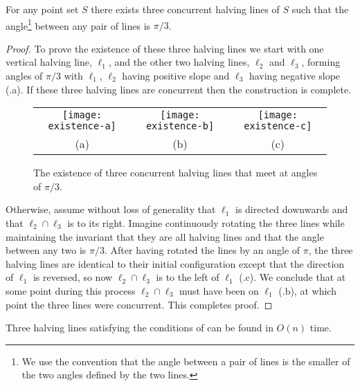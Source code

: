 \documentclass[lotsofwhite]{patmorin}
\begin{document}
\begin{lem}
For any point set $S$ there exists three concurrent halving lines 
of $S$ such that the angle\footnote{We use the convention that
the angle between a pair of lines is the smaller of the two angles
defined by the two lines.} between any pair of lines is $\pi/3$.
\end{lem}

\begin{proof}
To prove the existence of these three halving lines we start with one
vertical halving line, $\ell_1$, and the other two halving lines,
$\ell_2$ and $\ell_3$, forming angles of $\pi/3$ with $\ell_1$,
$\ell_2$ having positive slope and $\ell_3$ having negative slope
(.a).  If these three halving lines are concurrent
then the construction is complete. 

\begin{figure}
\begin{center}\begin{tabular}{ccc}
\texttt{[image: existence-a]} &
\texttt{[image: existence-b]} &
\texttt{[image: existence-c]} \\
(a) & (b) & (c)
\end{tabular}\end{center}
\caption{The existence of three concurrent halving lines that meet at angles of
$\pi/3$.}
\end{figure}
Otherwise, assume without loss of generality that $\ell_1$ is directed downwards and that
$\ell_2\cap \ell_3$ is to its right.  Imagine continuously rotating
the three lines while maintaining the invariant that they are all
halving lines and that the angle between any two is $\pi/3$.  After
having rotated the lines by an angle of $\pi$, the three halving lines
are identical to their initial configuration except that the direction
of $\ell_1$ is reversed, so now $\ell_2\cap\ell_3$ is to the left of
$\ell_1$ (.c).  We conclude that at some point
during this process $\ell_2\cap\ell_3$ must have been on $\ell_1$
(.b), at which point the three lines were
concurrent.  This completes proof.  
\end{proof}

\begin{lem}
Three halving lines satisfying the conditions of 
can be found in $O(n)$ time.
\end{lem}
\end{document}
